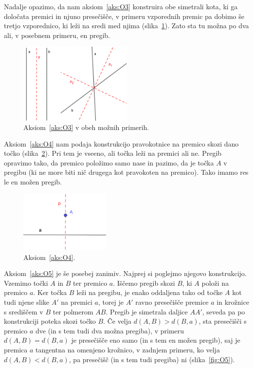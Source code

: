 Nadalje opazimo, da nam aksiom~\ref{aks:O3} konstruira obe simetrali kota, ki ga določata premici in njuno presečišče, v primeru vzporednih premic pa dobimo še tretjo vzporednico, ki leži na sredi med njima (slika~\ref{fig:O3}). Zato sta tu možna po dva ali, v posebnem primeru, en pregib.

\begin{figure}[h]
    \centering
    \includegraphics[width=0.5\textwidth]{images/origami_aksiomi/O3.png}
    \caption[Aksiom~\ref{aks:O3}]{Aksiom~\ref{aks:O3} v obeh možnih primerih.}
    \label{fig:O3}
\end{figure}

Aksiom~\ref{aks:O4} nam podaja konstrukcijo pravokotnice na premico skozi dano točko (slika~\ref{fig:O4}). Pri tem je vseeno, ali točka leži na premici ali ne. Pregib opravimo tako, da premico položimo samo nase in pazimo, da je točka $A$ v pregibu (ki ne more biti nič drugega kot pravokoten na premico). Tako imamo res le en možen pregib.

\begin{figure}[h]
    \centering
    \includegraphics[width=0.4\textwidth]{images/origami_aksiomi/O4.png}
    \caption[Aksiom~\ref{aks:O4}]{Aksiom~\ref{aks:O4}.}
    \label{fig:O4}
\end{figure}

Aksiom~\ref{aks:O5} je še posebej zanimiv. Najprej si poglejmo njegovo konstrukcijo. Vzemimo točki $A$ in $B$ ter premico $a$. Iščemo pregib skozi $B$, ki $A$ položi na premico $a$. Ker točka $B$ leži na pregibu, je enako oddaljena tako od točke $A$ kot tudi njene slike $A'$ na premici $a$, torej je $A'$ ravno presečišče premice $a$ in krožnice s središčem v $B$ ter polmerom $AB$. Pregib je simetrala daljice $AA'$, seveda pa po konstrukciji poteka skozi točko $B$. Če velja $ d(A,B) > d(B,a) $, sta presečišči s premico $a$ dve (in s tem tudi dva možna pregiba), v primeru $ d(A,B) = d(B,a) $ je presečišče eno samo (in s tem en možen pregib), saj je premica $a$ tangentna na omenjeno krožnico, v zadnjem primeru, ko velja $ d(A,B) < d(B,a) $, pa presečišč (in s tem tudi pregiba) ni (slika~\ref{fig:O5}).

